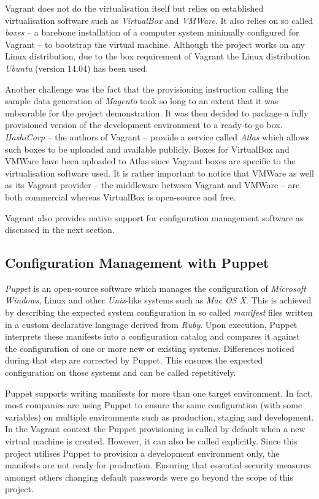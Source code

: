 Vagrant does not do the virtualisation itself but relies on established virtualisation software such as \emph{VirtualBox} and \emph{VMWare}. It also relies on so called \emph{boxes} -- a barebone installation of a computer system minimally configured for Vagrant -- to bootstrap the virtual machine. Although the project works on any Linux distribution, due to the box requirement of Vagrant the Linux distribution \emph{Ubuntu} (version 14.04) has been used.

Another challenge was the fact that the provisioning instruction calling the sample data generation of \emph{Magento} took so long to an extent that it was unbearable for the project demonstration. It was then decided to package a fully provisioned version of the development environment to a ready-to-go box. \emph{HashiCorp} -- the authors of Vagrant -- provide a service called \emph{Atlas} which allows such boxes to be uploaded and available publicly. Boxes for VirtualBox and VMWare have been uploaded to Atlas since Vagrant boxes are specific to the virtualisation software used. It is rather important to notice that VMWare as well as its Vagrant provider -- the middleware between Vagrant and VMWare -- are both commercial whereas VirtualBox is open-source and free.

Vagrant also provides native support for configuration management software as discussed in the next section.

\subsection{Configuration Management with Puppet}

\emph{Puppet} is an open-source software which manages the configuration of \emph{Microsoft Windows}, Linux and other \emph{Unix}-like systems such as \emph{Mac OS X}. This is achieved by describing the expected system configuration in so called \emph{manifest} files written in a custom declarative language derived from \emph{Ruby}. Upon execution, Puppet interprets these manifests into a configuration catalog and compares it against the configuration of one or more new or existing systems. Differences noticed during that step are corrected by Puppet. This ensures the expected configuration on those systems and can be called repetitively.

Puppet supports writing manifests for more than one target environment. In fact, most companies are using Puppet to ensure the same configuration (with some variables) on multiple environments such as production, staging and development. In the Vagrant context the Puppet provisioning is called by default when a new virtual machine is created. However, it can also be called explicitly. Since this project utilises Puppet to provision a development environment only, the manifests are not ready for production. Ensuring that essential security measures amongst others changing default passwords were go beyond the scope of this project.

